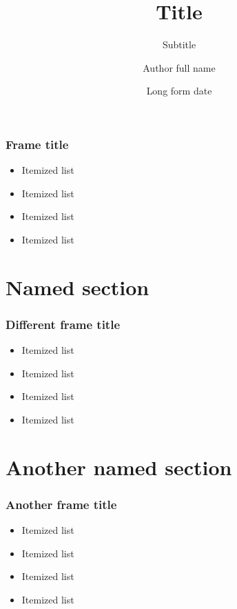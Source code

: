 \documentclass[12pt]{beamer}
\title{Title}
\subtitle{Subtitle}
\author[Author]{Author full name}
\institute[Inst]{Institute full name}
\date[Date]{Long form date}
\begin{document}
\begin{frame}[plain]
  \titlepage
\end{frame}

\begin{frame}
  \frametitle{Frame title}
  \begin{itemize}
    \item Itemized list
    \item Itemized list
    \item Itemized list
    \item Itemized list
  \end{itemize}
\end{frame}

\section{Named section}

\begin{frame}
  \frametitle{Different frame title}
  \begin{itemize}
    \item Itemized list
    \item Itemized list
    \item Itemized list
    \item Itemized list
  \end{itemize}
\end{frame}

\section{Another named section}

\begin{frame}
  \frametitle{Another frame title}
  \begin{itemize}
    \item Itemized list
    \item Itemized list
    \item Itemized list
    \item Itemized list
  \end{itemize}
\end{frame}
\end{document}
